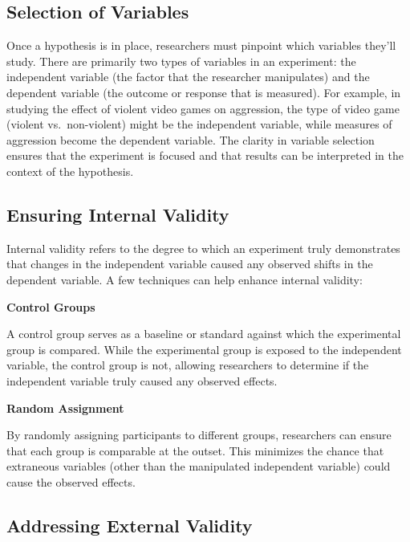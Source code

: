 \documentclass[
  b5paper]{book}
\begin{document}
\hypertarget{selection-of-variables}{%
\subsection*{Selection of Variables}\label{selection-of-variables}}

Once a hypothesis is in place, researchers must pinpoint which variables they'll study. There are primarily two types of variables in an experiment: the independent variable (the factor that the researcher manipulates) and the dependent variable (the outcome or response that is measured). For example, in studying the effect of violent video games on aggression, the type of video game (violent vs.~non-violent) might be the independent variable, while measures of aggression become the dependent variable. The clarity in variable selection ensures that the experiment is focused and that results can be interpreted in the context of the hypothesis.

\hypertarget{ensuring-internal-validity}{%
\subsection*{Ensuring Internal Validity}\label{ensuring-internal-validity}}

Internal validity refers to the degree to which an experiment truly demonstrates that changes in the independent variable caused any observed shifts in the dependent variable. A few techniques can help enhance internal validity:

\textbf{Control Groups}

A control group serves as a baseline or standard against which the experimental group is compared. While the experimental group is exposed to the independent variable, the control group is not, allowing researchers to determine if the independent variable truly caused any observed effects.

\textbf{Random Assignment}

By randomly assigning participants to different groups, researchers can ensure that each group is comparable at the outset. This minimizes the chance that extraneous variables (other than the manipulated independent variable) could cause the observed effects.

\hypertarget{addressing-external-validity}{%
\subsection*{Addressing External Validity}\label{addressing-external-validity}}
\end{document}
